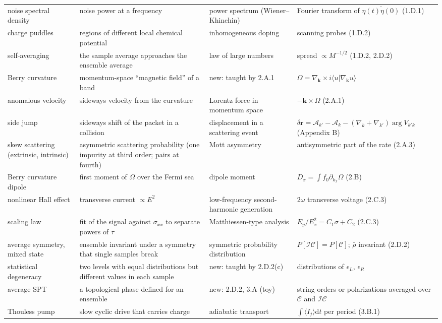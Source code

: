 \documentclass[11pt,a4paper]{article}
\newcommand{\dd}{\mathrm d}
\newcommand{\avg}[1]{\overline{#1}}
\begin{document}
{\begin{longtable}{@{}p{30mm}p{45mm}p{38mm}p{40mm}@{}}
noise spectral density&noise power at a frequency&power spectrum (Wiener--Khinchin)&Fourier transform of $\avg{\eta(t)\eta(0)}$ (1.D.1)\\
charge puddles&regions of different local chemical potential&inhomogeneous doping&scanning probes (1.D.2)\\
self-averaging&the sample average approaches the ensemble average&law of large numbers&spread $\propto M^{-1/2}$ (1.D.2, 2.D.2)\\
Berry curvature&momentum-space ``magnetic field'' of a band&new: taught by 2.A.1&$\Omega=\nabla_{\bm k}\times i\langle u|\nabla_{\bm k}u\rangle$\\
anomalous velocity&sideways velocity from the curvature&Lorentz force in momentum space&$-\dot{\bm k}\times\Omega$ (2.A.1)\\
side jump&sideways shift of the packet in a collision&displacement in a scattering event&$\delta\bm r=\mathcal A_{k'}-\mathcal A_k-(\nabla_k+\nabla_{k'})\arg V_{k'k}$ (Appendix B)\\
skew scattering (extrinsic, intrinsic)&asymmetric scattering probability (one impurity at third order; pairs at fourth)&Mott asymmetry&antisymmetric part of the rate (2.A.3)\\
Berry curvature dipole&first moment of $\Omega$ over the Fermi sea&dipole moment&$D_x=\int f_0\partial_{k_x}\Omega$ (2.B)\\
nonlinear Hall effect&transverse current $\propto E^2$&low-frequency second-harmonic generation&$2\omega$ transverse voltage (2.C.3)\\
scaling law&fit of the signal against $\sigma_{xx}$ to separate powers of $\tau$&Matthiessen-type analysis&$E_y/E_x^2=C_1\sigma+C_2$ (2.C.3)\\
average symmetry, mixed state&ensemble invariant under a symmetry that single samples break&symmetric probability distribution&$P[\mathcal I\mathcal C]=P[\mathcal C]$; $\bar\rho$ invariant (2.D.2)\\
statistical degeneracy&two levels with equal distributions but different values in each sample&new: taught by 2.D.2(c)&distributions of $\epsilon_L$, $\epsilon_R$\\
average SPT&a topological phase defined for an ensemble&new: 2.D.2, 3.A (toy)&string orders or polarizations averaged over $\mathcal C$ and $\mathcal I\mathcal C$\\
Thouless pump&slow cyclic drive that carries charge&adiabatic transport&$\int\langle I_j\rangle\dd t$ per period (3.B.1)\\

\end{longtable}}
\end{document}

